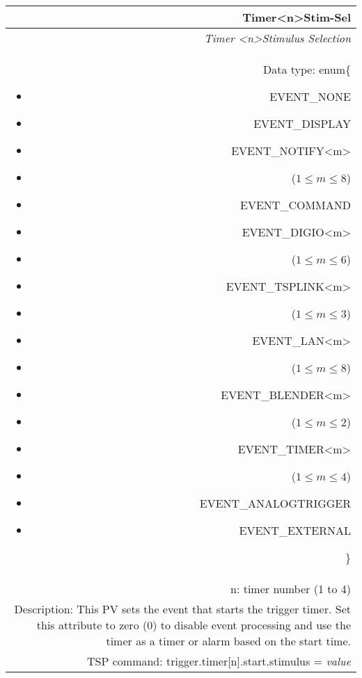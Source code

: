 \documentclass[openany]{article}
\begin{document}
		\begin{tabular}{N}
			\hline
			\bfseries Timer{\textless n\textgreater}Stim-Sel\label{pv:timerstim-sel} \\ \hline
			\emph{Timer \textless n\textgreater Stimulus Selection} \\
			Data type: enum\{\begin{itemize}[noitemsep]
				\small
				\item[] EVENT\_NONE
				\item[] EVENT\_DISPLAY
				\item[] EVENT\_NOTIFY\textless m\textgreater
				\item[] ($1\leq m\leq 8$)
				\item[] EVENT\_COMMAND
				\item[] EVENT\_DIGIO\textless m\textgreater
				\item[] ($1\leq m\leq 6$)
				\item[] EVENT\_TSPLINK\textless m\textgreater
				\item[] ($1\leq m\leq 3$)
				\item[] EVENT\_LAN\textless m\textgreater
				\item[] ($1\leq m\leq 8$)
				\item[] EVENT\_BLENDER\textless m\textgreater 
				\item[] ($1\leq m\leq 2$)
				\item[] EVENT\_TIMER\textless m\textgreater
				\item[] ($1\leq m\leq 4$)
				\item[] EVENT\_ANALOGTRIGGER
				\item[] EVENT\_EXTERNAL
			\end{itemize}\} \\
			n: timer number (1 to 4) \\
			Description: This PV sets the event that starts the trigger timer. Set this attribute to zero (0) to disable event processing and use the timer as a timer or alarm based on the start time. \\
			TSP command: trigger.timer[n].start.stimulus = \emph{value}
		\end{tabular}
\end{document}
